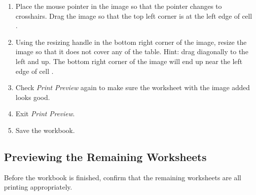 \begin{enumbox}
	\begin{enumerate}
		\item Place the mouse pointer in the image so that the pointer changes to crosshairs. Drag the image so that the top left corner is at the left edge of cell .
		\item Using the resizing handle in the bottom right corner of the image, resize the image so that it does not cover any of the table. Hint: drag diagonally to the left and up. The bottom right corner of the image will end up near the left edge of cell .
		\item Check \textit{Print Preview} again to make sure the worksheet with the image added looks good.
		\item Exit \textit{Print Preview}.
		\item Save the  workbook.
	\end{enumerate}
\end{enumbox}
	
\subsection{Previewing the Remaining Worksheets}

Before the workbook is finished, confirm that the remaining worksheets are all printing appropriately.

